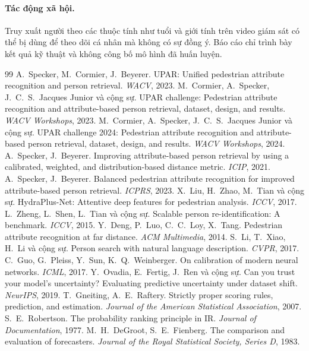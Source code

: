 \documentclass[11pt,a4paper]{article}
\begin{document}
\paragraph{Tác động xã hội.} Truy xuất người theo các thuộc tính như tuổi và giới tính trên video giám sát có thể bị dùng để theo dõi cá nhân mà không có sự đồng ý. Báo cáo chỉ trình bày kết quả kỹ thuật và không công bố mô hình đã huấn luyện.

\begin{thebibliography}{99}\small
{} A.~Specker, M.~Cormier, J.~Beyerer. UPAR: Unified pedestrian attribute recognition and person retrieval. \textit{WACV}, 2023.
 M.~Cormier, A.~Specker, J.~C.~S.~Jacques Junior và cộng sự. UPAR challenge: Pedestrian attribute recognition and attribute-based person retrieval, dataset, design, and results. \textit{WACV Workshops}, 2023.
 M.~Cormier, A.~Specker, J.~C.~S.~Jacques Junior và cộng sự. UPAR challenge 2024: Pedestrian attribute recognition and attribute-based person retrieval, dataset, design, and results. \textit{WACV Workshops}, 2024.
 A.~Specker, J.~Beyerer. Improving attribute-based person retrieval by using a calibrated, weighted, and distribution-based distance metric. \textit{ICIP}, 2021.
 A.~Specker, J.~Beyerer. Balanced pedestrian attribute recognition for improved attribute-based person retrieval. \textit{ICPRS}, 2023.
 X.~Liu, H.~Zhao, M.~Tian và cộng sự. HydraPlus-Net: Attentive deep features for pedestrian analysis. \textit{ICCV}, 2017.
 L.~Zheng, L.~Shen, L.~Tian và cộng sự. Scalable person re-identification: A benchmark. \textit{ICCV}, 2015.
 Y.~Deng, P.~Luo, C.~C.~Loy, X.~Tang. Pedestrian attribute recognition at far distance. \textit{ACM Multimedia}, 2014.
 S.~Li, T.~Xiao, H.~Li và cộng sự. Person search with natural language description. \textit{CVPR}, 2017.
 C.~Guo, G.~Pleiss, Y.~Sun, K.~Q.~Weinberger. On calibration of modern neural networks. \textit{ICML}, 2017.
 Y.~Ovadia, E.~Fertig, J.~Ren và cộng sự. Can you trust your model's uncertainty? Evaluating predictive uncertainty under dataset shift. \textit{NeurIPS}, 2019.
 T.~Gneiting, A.~E.~Raftery. Strictly proper scoring rules, prediction, and estimation. \textit{Journal of the American Statistical Association}, 2007.
 S.~E.~Robertson. The probability ranking principle in IR. \textit{Journal of Documentation}, 1977.
 M.~H.~DeGroot, S.~E.~Fienberg. The comparison and evaluation of forecasters. \textit{Journal of the Royal Statistical Society, Series D}, 1983.

\end{thebibliography}
\end{document}
